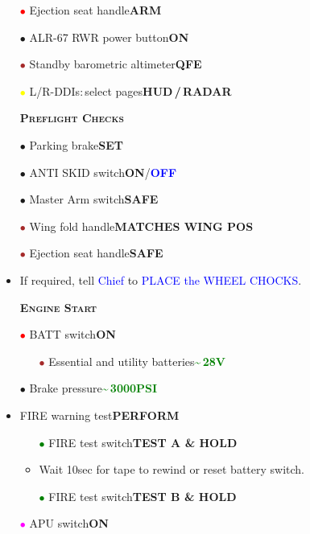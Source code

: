 \documentclass[a4paper,12pt,dvipsnames]{letter}
\newcommand{\radio}[1]{\textcolor{blue}{#1}}
\newcommand{\button}[1]{\textbf{#1}}
\newcommand{\ok}[1]{\textcolor{Green}{\textbf{#1}}}
\newcommand{\boat}[1]{\textcolor{Blue}{\textbf{#1}}}
\newcommand{\myHead}[1]{{\LARGE\textsc{\textbf{#1}}}}
\newcommand{\bi}{\textcolor{ProcessBlue}{$\bullet$\;}}
\newcommand{\ri}{\textcolor{Red}{$\bullet$\;}}
\newcommand{\gi}{\textcolor{Green}{$\bullet$\;}}
\newcommand{\yi}{\textcolor{Yellow}{$\bullet$\;}}
\newcommand{\mi}{\textcolor{Magenta}{$\bullet$\;}}
\newcommand{\ai}{\textcolor{Apricot}{$\bullet$\;}}
\renewcommand{\ni}{\textcolor{Brown}{$\bullet$\;}}
\begin{document}
{\begin{itemize}
 \item[\ri] Ejection seat handle\dotfill\button{ARM}
 \item[\ai] ALR-67 RWR power button\dotfill\button{ON}
 \item[\ni] Standby barometric altimeter\dotfill\button{QFE}
 \item[\yi] L/R-DDIs:\,select pages\dotfill\button{HUD\,/\,RADAR}
\end{itemize}
\newpage
\begin{itemize}
 \item[] \myHead{Preflight Checks}
 \item[\bi] Parking brake\dotfill\button{SET}
 \item[\bi] ANTI SKID switch\dotfill\button{ON}/\boat{OFF}
 \item[\bi] Master Arm switch\dotfill\button{SAFE}
 \item[\ni] Wing fold handle\dotfill\button{MATCHES WING POS}
 \item[\ni] Ejection seat handle\dotfill\button{SAFE}
 \item If required, tell \radio{Chief} to \radio{PLACE the WHEEL CHOCKS}.
\end{itemize}
\vspace{0.5em}
\begin{itemize}
 \item[] \myHead{Engine Start} 
 \item[\ri] BATT switch\dotfill\button{ON}
 \begin{itemize}
  \item[\ni] Essential and utility batteries\dotfill\ok{\textasciitilde\,28\;V}
 \end{itemize}
 \item[\bi] Brake pressure\dotfill\ok{\textasciitilde\,3000\;PSI}
 \item FIRE warning test\dotfill\button{PERFORM}
 \begin{itemize}
  \item[\gi] FIRE test switch\dotfill\button{TEST A \& HOLD}
  \item Wait 10\;sec for tape to rewind or reset battery switch.
  \item[\gi] FIRE test switch\dotfill\button{TEST B \& HOLD}
 \end{itemize}
 \item[\mi] APU switch\dotfill\button{ON}

\end{itemize}}
\end{document}
